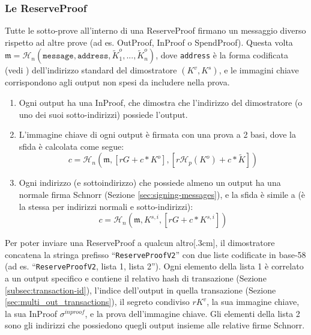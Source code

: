 \subsubsection*{Le ReserveProof}%

Tutte le sotto-prove all'interno di una ReserveProof firmano un messaggio diverso rispetto ad altre prove (ad es. OutProof, InProof o SpendProof). Questa volta $\mathfrak{m} = \mathcal{H}_n(\texttt{message}, \texttt{address}, \tilde{K}^o_1, ..., \tilde{K}^o_n)$, dove {\tt address} è la forma codificata (vedi \cite{luigi-address}) dell'indirizzo standard del dimostratore $(K^v, K^s)$, e le immagini chiave corrispondono agli output non spesi da includere nella prova.

\begin{enumerate}
    \item Ogni output ha una InProof, che dimostra che l'indirizzo del dimostratore (o uno dei suoi sotto-indirizzi) possiede l'output.
    \item L'immagine chiave di ogni output è firmata con una prova a 2 basi, dove la sfida è calcolata come segue:%
    \[c = \mathcal{H}_n(\mathfrak{m}, [r G + c*K^o], [r \mathcal{H}_p(K^o) + c*\tilde{K}])\]
    \item Ogni indirizzo (e sottoindirizzo) che possiede almeno un output ha una normale firma Schnorr (Sezione \ref{sec:signing-messages}), e la sfida è simile a (è la stessa per indirizzi normali e sotto-indirizzi):
    \[c = \mathcal{H}_n(\mathfrak{m}, K^{s,i}, [r G + c*K^{s,i}])\]
\end{enumerate}{}

Per poter inviare una ReserveProof a qualcun altro[.3cm], il dimostratore concatena la stringa prefisso ``{\tt ReserveProofV2}'' con due liste codificate in base-58 (ad es. ``{\tt ReserveProofV2}, lista 1, lista 2''). Ogni elemento della lista 1 è correlato a un output specifico e contiene il relativo hash di transazione (Sezione \ref{subsec:transaction-id}), l'indice dell'output in quella transazione (Sezione \ref{sec:multi_out_transactions}), il segreto condiviso $r K^v$, la sua immagine chiave, la sua InProof $\sigma^{inproof}$, e la prova dell'immagine chiave. Gli elementi della lista 2 sono gli indirizzi che possiedono quegli output insieme alle relative firme Schnorr.


